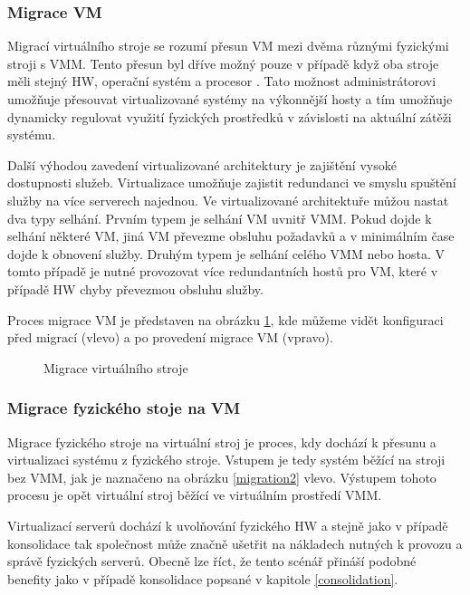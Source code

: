 \subsubsection*{Migrace VM}

Migrací virtuálního stroje se rozumí přesun VM mezi dvěma různými fyzickými stroji s VMM. Tento přesun byl dříve možný pouze v případě když oba stroje měli stejný HW, operační systém a procesor \cite{reasons}.
Tato možnost administrátorovi umožňuje přesouvat virtualizované systémy na výkonnější hosty a tím umožňuje dynamicky regulovat využití fyzických prostředků v závislosti na aktuální zátěži systému.

Další výhodou zavedení virtualizované architektury je zajištění vysoké dostupnosti služeb. Virtualizace umožňuje zajistit redundanci ve smyslu spuštění služby na více serverech najednou. Ve virtualizované architektuře můžou
nastat dva typy selhání. Prvním typem je selhání VM uvnitř VMM. Pokud dojde k selhání některé VM, jiná VM převezme obsluhu požadavků a v minimálním čase dojde k obnovení služby. Druhým typem je selhání celého VMM nebo hosta.
V tomto případě je nutné provozovat více redundantních hostů pro VM, které v případě HW chyby převezmou obsluhu služby.

Proces migrace VM je představen na obrázku \ref{migration1}, kde můžeme vidět konfiguraci před migrací (vlevo) a po provedení migrace VM (vpravo).

\begin{figure}
    \centering    
    \caption{Migrace virtuálního stroje}
    \label{migration1}
\end{figure}

\subsubsection*{Migrace fyzického stoje na VM}

Migrace fyzického stroje na virtuální stroj je proces, kdy dochází k přesunu a virtualizaci systému z fyzického stroje. Vstupem je tedy systém běžící na stroji bez VMM, jak je naznačeno na obrázku \ref{migration2} vlevo. 
Výstupem tohoto procesu je opět virtuální stroj běžící ve virtuálním prostředí VMM.

Virtualizací serverů dochází k uvolňování fyzického HW a stejně jako v případě konsolidace tak společnost může značně ušetřit na nákladech nutných k provozu a správě fyzických serverů. Obecně lze říct, že tento scénář přináší 
podobné benefity jako v případě konsolidace popsané v kapitole \ref{consolidation}.


